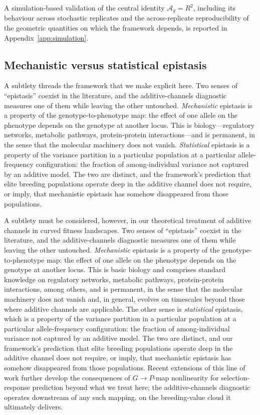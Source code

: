 \documentclass[9pt,twocolumn,twoside,lineno]{gsajnl}
\newcommand{\Ag}{\ensuremath{\mathcal{A}_{g}}\xspace}
\begin{document}
A simulation-based validation of the central identity $\Ag = R^2$, including its behaviour across stochastic replicates and the across-replicate reproducibility of the geometric quantities on which the framework depends, is reported in Appendix~\ref{app:simulation}.

\subsection{Mechanistic versus statistical epistasis}
\label{sec:mech_vs_stat}

A subtlety threads the framework that we make explicit here. Two senses of ``epistasis'' coexist in the literature, and the additive-channels diagnostic measures one of them while leaving the other untouched. \emph{Mechanistic} epistasis is a property of the genotype-to-phenotype map: the effect of one allele on the phenotype depends on the genotype at another locus. This is biology---regulatory networks, metabolic pathways, protein-protein interactions---and is permanent, in the sense that the molecular machinery does not vanish. \emph{Statistical} epistasis is a property of the variance partition in a particular population at a particular allele-frequency configuration: the fraction of among-individual variance not captured by an additive model. The two are distinct, and the framework's prediction that elite breeding populations operate deep in the additive channel does not require, or imply, that mechanistic epistasis has somehow disappeared from those populations. 

A subtlety must be considered, however, in our theoretical treatment of additive channels in curved fitness landscapes. Two senses of ``epistasis'' coexist in the literature, and the additive-channels diagnostic measures one of them while leaving the other untouched. \emph{Mechanistic} epistasis is a property of the genotype-to-phenotype map: the effect of one allele on the phenotype depends on the genotype at another locus. This is basic biology and comprises standard knowledge on regulatory networks, metabolic pathways, protein-protein interactions, among others, and is permanent, in the sense that the molecular machinery does not vanish and, in general, evolves on timescales beyond those where additive channels are applicable. The other sense is \emph{statistical} epistasis, which is a property of the variance partition in a particular population at a particular allele-frequency configuration: the fraction of among-individual variance not captured by an additive model. The two are distinct, and our framework's prediction that elite breeding populations operate deep in the additive channel does not require, or imply, that mechanistic epistasis has somehow disappeared from those populations. Recent extensions of this line of work \citep{Morrissey2015, GonzalezForero2026} further develop the consequences of $G\!\to\!P$-map nonlinearity for selection-response prediction beyond what we treat here; the additive-channels diagnostic operates downstream of any such mapping, on the breeding-value cloud it ultimately delivers.
\end{document}

